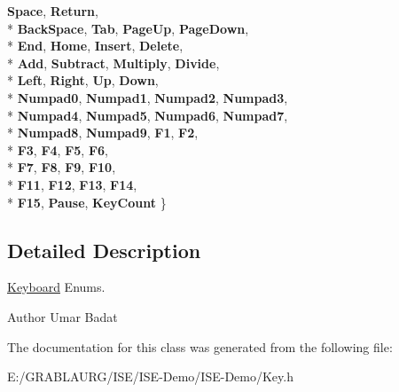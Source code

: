 \begin{DoxyCompactItemize}
{\bfseries Space}, 
{\bfseries Return}, 
\\*
{\bfseries Back\-Space}, 
{\bfseries Tab}, 
{\bfseries Page\-Up}, 
{\bfseries Page\-Down}, 
\\*
{\bfseries End}, 
{\bfseries Home}, 
{\bfseries Insert}, 
{\bfseries Delete}, 
\\*
{\bfseries Add}, 
{\bfseries Subtract}, 
{\bfseries Multiply}, 
{\bfseries Divide}, 
\\*
{\bfseries Left}, 
{\bfseries Right}, 
{\bfseries Up}, 
{\bfseries Down}, 
\\*
{\bfseries Numpad0}, 
{\bfseries Numpad1}, 
{\bfseries Numpad2}, 
{\bfseries Numpad3}, 
\\*
{\bfseries Numpad4}, 
{\bfseries Numpad5}, 
{\bfseries Numpad6}, 
{\bfseries Numpad7}, 
\\*
{\bfseries Numpad8}, 
{\bfseries Numpad9}, 
{\bfseries F1}, 
{\bfseries F2}, 
\\*
{\bfseries F3}, 
{\bfseries F4}, 
{\bfseries F5}, 
{\bfseries F6}, 
\\*
{\bfseries F7}, 
{\bfseries F8}, 
{\bfseries F9}, 
{\bfseries F10}, 
\\*
{\bfseries F11}, 
{\bfseries F12}, 
{\bfseries F13}, 
{\bfseries F14}, 
\\*
{\bfseries F15}, 
{\bfseries Pause}, 
{\bfseries Key\-Count}
 \}
\end{DoxyCompactItemize}


\subsection{Detailed Description}
\hyperlink{class_keyboard}{Keyboard} Enums. 

\begin{DoxyAuthor}{Author}
Umar Badat 
\end{DoxyAuthor}


The documentation for this class was generated from the following file\-:\begin{DoxyCompactItemize}
\item 
E\-:/\-G\-R\-A\-B\-L\-A\-U\-R\-G/\-I\-S\-E/\-I\-S\-E-\/\-Demo/\-I\-S\-E-\/\-Demo/Key.\-h\end{DoxyCompactItemize}
